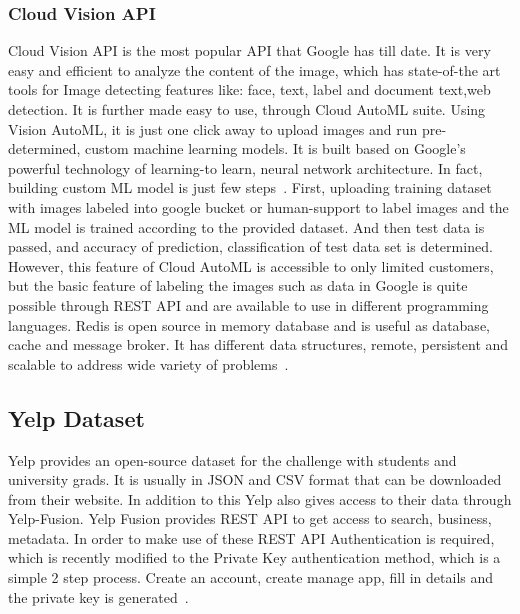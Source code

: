 \subsubsection{Cloud Vision API} 

Cloud Vision API is the most popular API that Google has till date. It
is very easy and efficient to analyze the content of the image, which
has state-of-the art tools for Image detecting features like: face,
text, label and document text,web detection.  It is further made easy
to use, through Cloud AutoML suite. Using Vision AutoML, it is just
one click away to upload images and run pre-determined, custom machine
learning models. It is built based on Google’s powerful technology of
learning-to learn, neural network architecture. In fact, building
custom ML model is just few
steps~\cite{hid-sp18-602-cloud-automl}. First, uploading training
dataset with images labeled into google bucket or human-support to
label images and the ML model is trained according to the provided
dataset. And then test data is passed, and accuracy of prediction,
classification of test data set is determined. However, this feature
of Cloud AutoML is accessible to only limited customers, but the basic
feature of labeling the images such as data in Google is quite
possible through REST API and are available to use in different
programming languages.  Redis is open source in memory database and is
useful as database, cache and message broker. It has different data
structures, remote, persistent and scalable to address wide variety of
problems~\cite{hid-sp18-602-cloud-vision}.

\subsection{Yelp Dataset}

Yelp provides an open-source dataset for the challenge with students
and university grads. It is usually in JSON and CSV format that can be
downloaded from their website. In addition to this Yelp also gives
access to their data through Yelp-Fusion. Yelp Fusion provides REST
API to get access to search, business, metadata. In order to make use
of these REST API Authentication is required, which is recently
modified to the Private Key authentication method, which is a simple 2
step process. Create an account, create manage app, fill in details
and the private key is generated~\cite{hid-sp18-602-yelp}.


